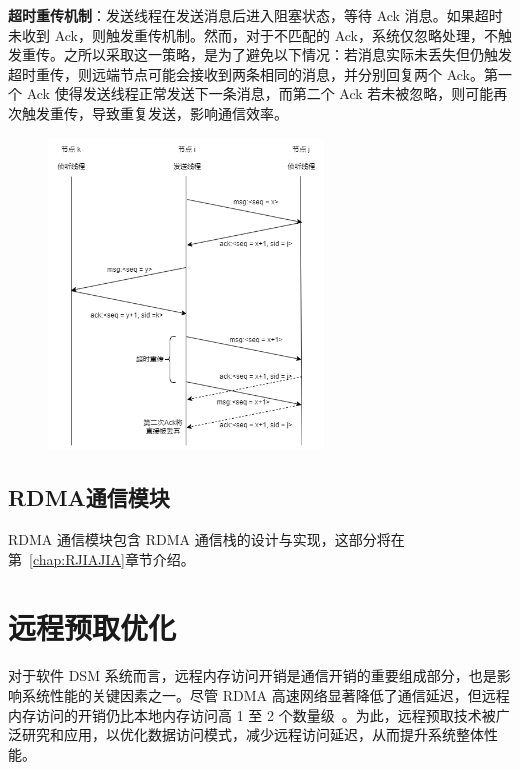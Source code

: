 {\begin{enumerate}[label=\arabic*.]
              \textbf{超时重传机制}：发送线程在发送消息后进入阻塞状态，等待 Ack 消息。如果超时未收到 Ack，则触发重传机制。然而，对于不匹配的 Ack，系统仅忽略处理，不触发重传。之所以采取这一策略，是为了避免以下情况：若消息实际未丢失但仍触发超时重传，则远端节点可能会接收到两条相同的消息，并分别回复两个 Ack。第一个 Ack 使得发送线程正常发送下一条消息，而第二个 Ack 若未被忽略，则可能再次触发重传，导致重复发送，影响通信效率。

              \begin{figure}[H]
                  \centering
                  \includegraphics[width=0.65\textwidth]{Img/M-JIAJIA-reliable-comm.png}
                  \label{fig:mjiajia-reliable-comm}
              \end{figure}

    \end{enumerate}

    \subsection{RDMA通信模块}
    RDMA 通信模块包含 RDMA 通信栈的设计与实现，这部分将在第~\ref{chap:RJIAJIA}章节介绍。

    \section{远程预取优化}
    对于软件 DSM 系统而言，远程内存访问开销是通信开销的重要组成部分，也是影响系统性能的关键因素之一。尽管 RDMA 高速网络显著降低了通信延迟，但远程内存访问的开销仍比本地内存访问高 1 至 2 个数量级~\citep{cai2018gam}。为此，远程预取技术被广泛研究和应用，以优化数据访问模式，减少远程访问延迟，从而提升系统整体性能。

}

